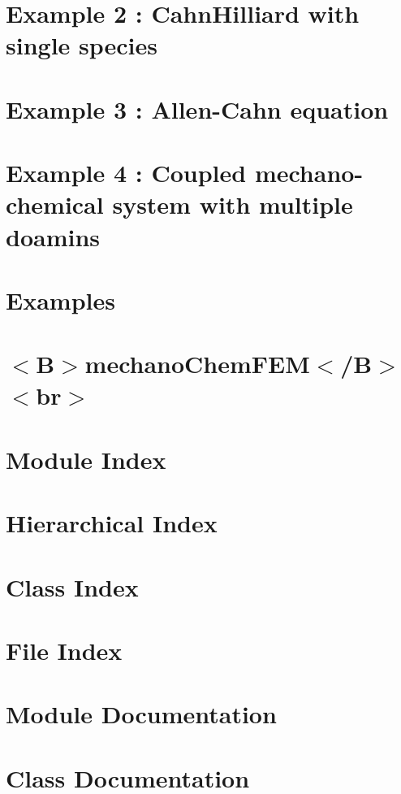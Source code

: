 \documentclass[twoside]{book}
\begin{document}
\chapter{Example 2 \-: Cahn\-Hilliard with single species}
\label{_cahn_hilliard}

\chapter{Example 3 \-: Allen-\/\-Cahn equation}
\label{_allen__cahn}

\chapter{Example 4 \-: Coupled mechano-\/chemical system with multiple doamins}
\label{growth}

\chapter{Examples}
\label{examples}

\chapter{$<$B$>$mechano\-Chem\-F\-E\-M$<$/\-B$>$$<$br$>$}
\label{md_mechano_chem_f_e_m_doxygen_readme}

\chapter{Module Index}

\chapter{Hierarchical Index}

\chapter{Class Index}

\chapter{File Index}

\chapter{Module Documentation}


\chapter{Class Documentation}











\end{document}
